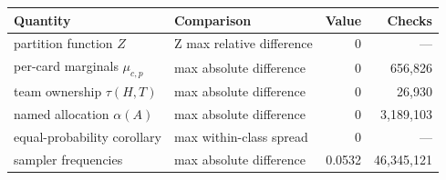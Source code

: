 \begin{tabular}{llrr}
\toprule
Quantity & Comparison & Value & Checks \\
\midrule
partition function $Z$ & Z max relative difference & $0$ & --- \\
per-card marginals $\mu_{c,p}$ & max absolute difference & $0$ & 656{,}826 \\
team ownership $\tau(H,T)$ & max absolute difference & $0$ & 26{,}930 \\
named allocation $\alpha(A)$ & max absolute difference & $0$ & 3{,}189{,}103 \\
equal-probability corollary & max within-class spread & $0$ & --- \\
sampler frequencies & max absolute difference & 0.0532 & 46{,}345{,}121 \\
\bottomrule
\end{tabular}